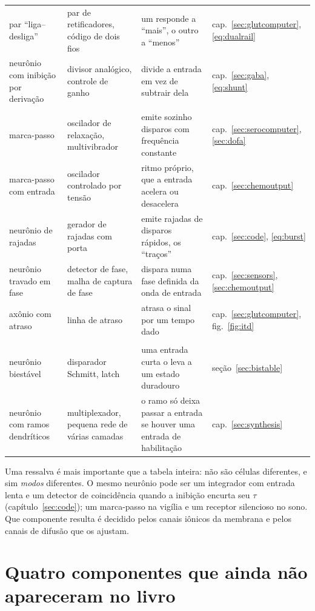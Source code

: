 \begin{center}
\begin{longtable}{>{\raggedright}p{3.1cm}>{\raggedright}p{3.3cm}>{\raggedright}p{4.7cm}>{\raggedright\arraybackslash}p{2.4cm}}
par ``liga--desliga'' & par de retificadores, código de dois fios & um responde a ``mais'', o outro a ``menos'' & cap.~\ref{sec:glutcomputer}, \eqref{eq:dualrail} \\
neurônio com inibição por derivação & divisor analógico, controle de ganho & divide a entrada em vez de subtrair dela & cap.~\ref{sec:gaba}, \eqref{eq:shunt} \\
\midrule
\multicolumn{4}{l}{\emph{Geradores e tempo}} \\
marca-passo & oscilador de relaxação, multivibrador & emite sozinho disparos com frequência constante & cap.~\ref{sec:serocomputer}, \ref{sec:dofa} \\
marca-passo com entrada & oscilador controlado por tensão & ritmo próprio, que a entrada acelera ou desacelera & cap.~\ref{sec:chemoutput} \\
neurônio de rajadas & gerador de rajadas com porta & emite rajadas de disparos rápidos, os ``traços'' & cap.~\ref{sec:code}, \eqref{eq:burst} \\
neurônio travado em fase & detector de fase, malha de captura de fase & dispara numa fase definida da onda de entrada & cap.~\ref{sec:sensors}, \ref{sec:chemoutput} \\
axônio com atraso & linha de atraso & atrasa o sinal por um tempo dado & cap.~\ref{sec:glutcomputer}, fig.~\ref{fig:itd} \\
\midrule
\multicolumn{4}{l}{\emph{Memória e comutação}} \\
neurônio biestável & disparador Schmitt, latch & uma entrada curta o leva a um estado duradouro & seção~\ref{sec:bistable} \\
neurônio com ramos dendríticos & multiplexador, pequena rede de várias camadas & o ramo só deixa passar a entrada se houver uma entrada de habilitação & cap.~\ref{sec:synthesis} \\
\end{longtable}
\end{center}

Uma ressalva é mais importante que a tabela inteira: não são células diferentes, e sim \emph{modos} diferentes. O mesmo neurônio pode ser um integrador com entrada lenta e um detector de coincidência quando a inibição encurta seu $\tau$ (capítulo~\ref{sec:code}); um marca-passo na vigília e um receptor silencioso no sono. Que componente resulta é decidido pelos canais iônicos da membrana e pelos canais de difusão que os ajustam.

\section{Quatro componentes que ainda não apareceram no livro}


